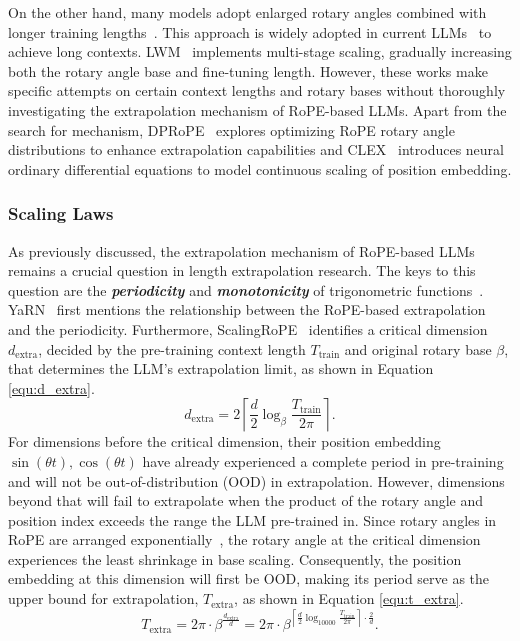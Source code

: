 On the other hand, many models adopt enlarged rotary angles combined with longer training lengths~\citep{roziere2023code, xiong2024effective}. This approach is widely adopted in current LLMs~\citep{cai2024internlm2, young2024yi, chatglm2024glmlong} to achieve long contexts. LWM~\citep{liu2024world} implements multi-stage scaling, gradually increasing both the rotary angle base and fine-tuning length. However, these works make specific attempts on certain context lengths and rotary bases without thoroughly investigating the extrapolation mechanism of RoPE-based LLMs. Apart from the search for mechanism, DPRoPE~\citep{wu2024extending} explores optimizing RoPE rotary angle distributions to enhance extrapolation capabilities and CLEX~\citep{chenclex} introduces neural ordinary differential equations to model continuous scaling of position embedding. 

\subsubsection{Scaling Laws}

As previously discussed, the extrapolation mechanism of RoPE-based LLMs remains a crucial question in length extrapolation research. The keys to this question are the \textbf{\textit{periodicity}} and \textbf{\textit{monotonicity}} of trigonometric functions~\citep{pengyarn,liuscaling,men2024base}. YaRN~\citep{pengyarn} first mentions the relationship between the RoPE-based extrapolation and the periodicity. Furthermore, ScalingRoPE~\citep{liuscaling} identifies a critical dimension $d_\text{extra}$, decided by the pre-training context length $T_\text{train}$ and original rotary base $\beta$, that determines the LLM's extrapolation limit, as shown in Equation \ref{equ:d_extra}. 
\begin{equation}
    d_\text{extra}=2\left\lceil\frac{d}{2}\log_\beta\frac{T_\text{train}}{2\pi}\right\rceil\text{.}
\label{equ:d_extra}\end{equation}
For dimensions before the critical dimension, their position embedding $\sin(\theta t), \cos(\theta t)$ have already experienced a complete period in pre-training and will not be out-of-distribution (OOD) in extrapolation. However, dimensions beyond that will fail to extrapolate when the product of the rotary angle and position index exceeds the range the LLM pre-trained in. Since rotary angles in RoPE are arranged exponentially~\citep{su2024roformer}, the rotary angle at the critical dimension experiences the least shrinkage in base scaling. Consequently, the position embedding at this dimension will first be OOD, making its period serve as the upper bound for extrapolation, $T_\text{extra}$, as shown in Equation \ref{equ:t_extra}.
\begin{equation}
    T_\text{extra}=2\pi\cdot\beta^{\frac{d_\text{extra}}{d}}=2\pi\cdot\beta^{\left\lceil\frac{d}{2}\log_{10000}\frac{T_\text{train}}{2\pi}\right\rceil\cdot\frac{2}{d}}\text{.}
\label{equ:t_extra}\end{equation}

